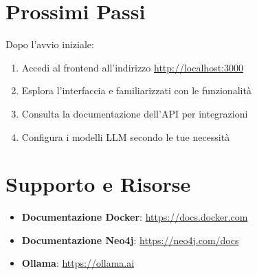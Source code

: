\section{Prossimi Passi}

Dopo l'avvio iniziale:

\begin{enumerate}
    \item Accedi al frontend all'indirizzo \href{http://localhost:3000}{http://localhost:3000}
    \item Esplora l'interfaccia e familiarizzati con le funzionalità
    \item Consulta la documentazione dell'API per integrazioni
    \item Configura i modelli LLM secondo le tue necessità
\end{enumerate}

\section{Supporto e Risorse}

\begin{itemize}
    \item \textbf{Documentazione Docker}: \href{https://docs.docker.com}{https://docs.docker.com}
    \item \textbf{Documentazione Neo4j}: \href{https://neo4j.com/docs}{https://neo4j.com/docs}
    \item \textbf{Ollama}: \href{https://ollama.ai}{https://ollama.ai}
\end{itemize}
